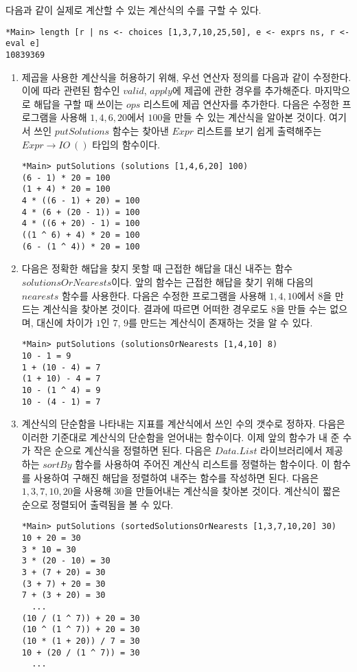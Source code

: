 다음과 같이 실제로 계산할 수 있는 계산식의 수를 구할 수 있다.
\begin{lstlisting}
*Main> length [r | ns <- choices [1,3,7,10,25,50], e <- exprs ns, r <- eval e]
10839369
\end{lstlisting}



\begin{enumerate}
\item 제곱을 사용한 계산식을 허용하기 위해, 우선 연산자 정의를 다음과
  같이 수정한다.
  이에 따라 관련된 함수인 $valid$, $apply$에 제곱에 관한 경우를 추가해준다.
  마지막으로 해답을 구할 때 쓰이는 $ops$ 리스트에 제곱 연산자를 추가한다.
  다음은 수정한 프로그램을 사용해 $1,4,6,20$에서 $100$을 만들 수 있는
  계산식을 알아본 것이다. 여기서 쓰인 $putSolutions$ 함수는 찾아낸 $Expr$
  리스트를 보기 쉽게 출력해주는 $Expr \rightarrow IO~()$ 타입의 함수이다.
  \begin{lstlisting}
*Main> putSolutions (solutions [1,4,6,20] 100)
(6 - 1) * 20 = 100
(1 + 4) * 20 = 100
4 * ((6 - 1) + 20) = 100
4 * (6 + (20 - 1)) = 100
4 * ((6 + 20) - 1) = 100
((1 ^ 6) + 4) * 20 = 100
(6 - (1 ^ 4)) * 20 = 100
  \end{lstlisting}
\item 다음은 정확한 해답을 찾지 못할 때 근접한 해답을 대신 내주는 함수
  $solutionsOrNearests$이다.
  앞의 함수는 근접한 해답을 찾기 위해 다음의 $nearests$ 함수를 사용한다.
  다음은 수정한 프로그램을 사용해 $1,4,10$에서 $8$을 만드는 계산식을
  찾아본 것이다. 결과에 따르면 어떠한 경우로도 $8$을 만들 수는
  없으며, 대신에 차이가 $1$인 $7$, $9$를 만드는 계산식이 존재하는 것을
  알 수 있다.
  \begin{lstlisting}
*Main> putSolutions (solutionsOrNearests [1,4,10] 8)
10 - 1 = 9
1 + (10 - 4) = 7
(1 + 10) - 4 = 7
10 - (1 ^ 4) = 9
10 - (4 - 1) = 7
  \end{lstlisting}
\item 계산식의 단순함을 나타내는 지표를 계산식에서 쓰인 수의 갯수로
  정하자. 다음은 이러한 기준대로 계산식의 단순함을 얻어내는 함수이다.
  이제 앞의 함수가 내 준 수가 작은 순으로 계산식을 정렬하면 된다.
  다음은 $Data.List$ 라이브러리에서 제공하는 $sortBy$ 함수를 사용하여 주어진
  계산식 리스트를 정렬하는 함수이다.
  이 함수를 사용하여 구해진 해답을 정렬하여 내주는 함수를 작성하면 된다.
  다음은 $1,3,7,10,20$을 사용해 $30$을 만들어내는 계산식을 찾아본
  것이다. 계산식이 짧은 순으로 정렬되어 출력됨을 볼 수 있다.
  \begin{lstlisting}
*Main> putSolutions (sortedSolutionsOrNearests [1,3,7,10,20] 30)
10 + 20 = 30
3 * 10 = 30
3 * (20 - 10) = 30
3 + (7 + 20) = 30
(3 + 7) + 20 = 30
7 + (3 + 20) = 30
  ...
(10 / (1 ^ 7)) + 20 = 30
(10 ^ (1 ^ 7)) + 20 = 30
(10 * (1 + 20)) / 7 = 30
10 + (20 / (1 ^ 7)) = 30
  ...
  \end{lstlisting}
\end{enumerate}

      